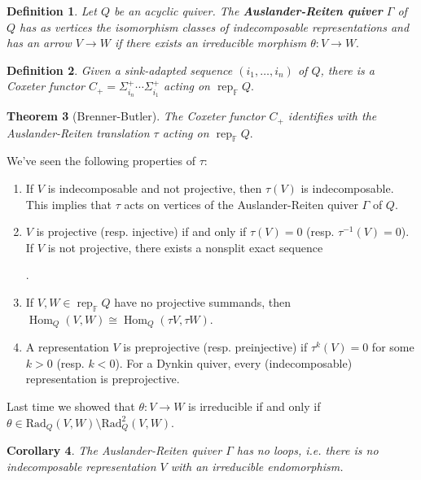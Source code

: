 \documentclass{book}
\newtheorem{theorem}{Theorem}[section]
\newtheorem{corollary}[theorem]{Corollary}
\newtheorem{definition}[theorem]{Definition}
\DeclareMathOperator{\Hom}{Hom}
\DeclareMathOperator{\rep}{rep}
\begin{document}
\begin{definition}
        Let $Q$ be an acyclic quiver. The \textbf{Auslander-Reiten quiver} $\Gamma$ of $Q$ has as vertices the isomorphism classes of indecomposable representations and has an arrow $V\to W$ if there exists an irreducible morphism $\theta:V\to W.$
    \end{definition}
    
    \begin{definition}
        Given a sink-adapted sequence $(i_1,\ldots,i_n)$ of $Q$, there is a Coxeter functor $C_+=\Sigma_{i_n}^+\cdots\Sigma_{i_1}^+$ acting on $\rep_\mathbb{F}Q.$
    \end{definition}
    
    \begin{theorem}[Brenner-Butler]
        The Coxeter functor $C_+$ identifies with the Auslander-Reiten translation $\tau$ acting on $\rep_\mathbb{F}Q.$
    \end{theorem}
    
    We've seen the following properties of $\tau$:
    \begin{enumerate}
        \item If $V$ is indecomposable and not projective, then $\tau(V)$ is indecomposable. This implies that $\tau$ acts on vertices of the Auslander-Reiten quiver $\Gamma$ of $Q$.
        \item $V$ is projective (resp. injective) if and only if $\tau(V)=0$ (resp. $\tau^{-1}(V)=0$). If $V$ is not projective, there exists a nonsplit exact sequence 
        .
        \item If $V,W\in \rep_\mathbb{F}Q$ have no projective summands, then $\Hom_Q(V,W)\cong \Hom_Q(\tau V,\tau W)$.
        \item A representation $V$ is preprojective (resp. preinjective) if $\tau^k(V)=0$ for some $k>0$ (resp. $k<0$). For a Dynkin quiver, every (indecomposable) representation is preprojective. 
    \end{enumerate}
    
    Last time we showed that $\theta:V\to W$ is irreducible if and only if $\theta\in \text{Rad}_Q(V,W)\setminus \text{Rad}^2_Q(V,W)$.
    
    \begin{corollary}
        The Auslander-Reiten quiver $\Gamma$ has no loops, i.e. there is no indecomposable representation $V$ with an irreducible endomorphism.
    \end{corollary}
    
\end{document}

